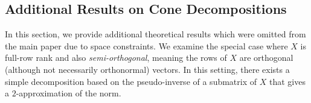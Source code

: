 \iffalse

    \subsection{Additional Results on Cone Decompositions}\label{app:additional-cone-results}

    In this section, we provide additional theoretical results which were omitted from the main paper due to space constraints.
    We examine the special case where \( X \) is full-row rank and also \emph{semi-orthogonal}, meaning the rows of \( X \) are orthogonal (although not necessarily orthonormal) vectors.
    In this setting, there exists a simple decomposition based on the pseudo-inverse of a submatrix of \( X \) that gives a \( 2 \)-approximation of the norm.

